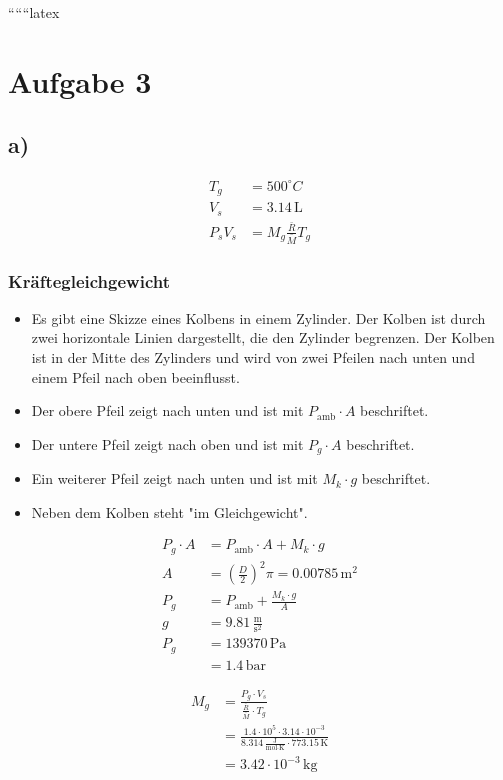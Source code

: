 
``````latex


\section*{Aufgabe 3}

\subsection*{a)}

\begin{align*}
T_g &= 500^\circ C \\
V_s &= 3.14 \, \text{L} \\
P_s V_s &= M_g \frac{\bar{R}}{\bar{M}} T_g
\end{align*}

\subsubsection*{Kräftegleichgewicht}

\begin{itemize}
    \item Es gibt eine Skizze eines Kolbens in einem Zylinder. Der Kolben ist durch zwei horizontale Linien dargestellt, die den Zylinder begrenzen. Der Kolben ist in der Mitte des Zylinders und wird von zwei Pfeilen nach unten und einem Pfeil nach oben beeinflusst.
    \item Der obere Pfeil zeigt nach unten und ist mit $P_{\text{amb}} \cdot A$ beschriftet.
    \item Der untere Pfeil zeigt nach oben und ist mit $P_g \cdot A$ beschriftet.
    \item Ein weiterer Pfeil zeigt nach unten und ist mit $M_k \cdot g$ beschriftet.
    \item Neben dem Kolben steht "im Gleichgewicht".
\end{itemize}

\begin{align*}
P_g \cdot A &= P_{\text{amb}} \cdot A + M_k \cdot g \\
A &= \left( \frac{D}{2} \right)^2 \pi = 0.00785 \, \text{m}^2 \\
P_g &= P_{\text{amb}} + \frac{M_k \cdot g}{A} \\
g &= 9.81 \, \frac{\text{m}}{\text{s}^2} \\
P_g &= 139370 \, \text{Pa} \\
&= 1.4 \, \text{bar}
\end{align*}

\begin{align*}
M_g &= \frac{P_g \cdot V_s}{\frac{\bar{R}}{\bar{M}} \cdot T_g} \\
&= \frac{1.4 \cdot 10^5 \cdot 3.14 \cdot 10^{-3}}{8.314 \, \frac{\text{J}}{\text{mol} \cdot \text{K}} \cdot 773.15 \, \text{K}} \\
&= 3.42 \cdot 10^{-3} \, \text{kg}
\end{align*}

